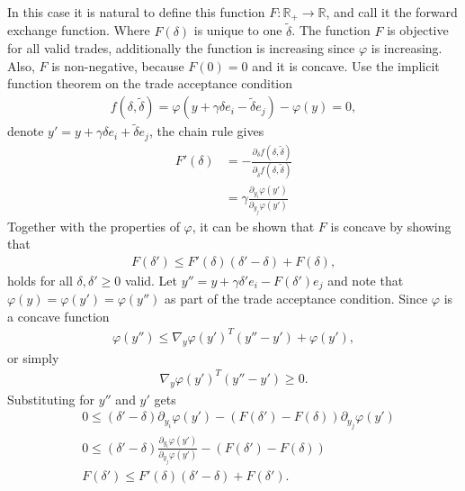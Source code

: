 In this case it is natural to define this function $F: \mathbb{R}_+ \to
\mathbb{R}$, and call it the forward exchange function. Where $F(\delta)$ is
unique to one $\tilde{\delta}$. The function $F$ is objective for all valid
trades, additionally the function is increasing since $\varphi$ is
increasing. Also, $F$ is non-negative, because $F(0) = 0$ and it is concave.
Use the implicit function theorem on the trade acceptance condition
\begin{align}
f(\delta, \tilde{\delta}) = \varphi(y + \gamma\delta e_i -\tilde{\delta}e_j)
- \varphi(y) =0,
\end{align}
denote $y' = y+\gamma\delta e_i + \tilde{\delta}e_j$, the chain rule gives
\begin{align}
    F'(\delta) &= -\frac{\partial_\delta f(\delta,
    \tilde{\delta})}{\partial_{\tilde{\delta}} f(\delta, \tilde{\delta})}\\
       &=\gamma \frac{\partial_{y_i}\varphi(y')}{\partial_{y_j}
       \varphi(y')} \label{eq: forward_implicit}
\end{align}
Together with the properties of $\varphi$, it can be shown that $F$ is
concave by showing that
\begin{align}
    F(\delta') \le F'(\delta)(\delta' - \delta) + F(\delta),
\end{align}
holds for all $\delta, \delta' \ge 0$ valid. Let $y'' = y + \gamma \delta' e_i -
F(\delta') e_j$ and note that $\varphi(y) = \varphi(y') = \varphi(y'')$ as
part of the trade acceptance condition. Since $\varphi$ is a concave function
\begin{align}
    \varphi(y'') \le \nabla_y\varphi(y')^{T} (y'' -y')+
    \varphi(y'),\label{eq: phi_concave}
\end{align}
or simply
\begin{align}
    \nabla_y\varphi(y')^{T} (y'' - y') \ge 0.
\end{align}
Substituting for $y''$ and $y'$ gets
\begin{align}
    &0 \le (\delta' -\delta)\partial_{y_i} \varphi(y') - (F(\delta') -
    F(\delta))\partial_{y_j}\varphi(y') \\
    &0 \le (\delta' -\delta)\frac{\partial_{y_i} \varphi(y')}{\partial_{y_j}
    \varphi(y')} - (F(\delta') - F(\delta))\\
    & F(\delta') \le F'(\delta)(\delta' - \delta) + F(\delta').
\end{align}

